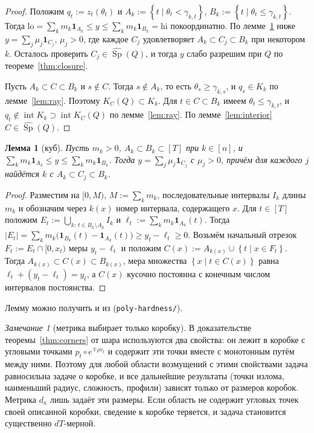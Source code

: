 \documentclass[a4paper,11pt]{article}
\newcommand{\lean}[1]{\mbox{\path{#1}}} %
\theoremstyle{plain}
\newtheorem{lemma}[theorem]{Лемма}
\theoremstyle{definition}
\theoremstyle{remark}
\newtheorem*{remark}{Замечание}
\newcommand{\abs}[1]{\left\lvert #1 \right\rvert}
\newcommand{\set}[1]{\left\{ #1 \right\}}
\DeclareMathOperator{\Sp}{Sp}
\DeclareMathOperator{\interior}{int}
\begin{document}
\begin{proof}
    Положим $q_t:=z_t(\theta_t)$ и $A_k:=\set{t\mid\theta_t<\gamma_{k,t}}$, $B_k:=\set{t\mid\theta_t\le\gamma_{k,t}}$. Тогда $\mathrm{lo}=\sum_km_k\mathbf 1_{A_k}\le y\le\sum_km_k\mathbf 1_{B_k}=\mathrm{hi}$ покоординатно. По лемме~\ref{lem:cube} ниже $y=\sum_j\mu_j\mathbf 1_{C_j}$, $\mu_j>0$, где каждое $C_j$ удовлетворяет $A_k\subset C_j\subset B_k$ при некотором $k$. Осталось проверить $C_j\in\widehat{\Sp}(Q)$, и тогда $y$ слабо разрешим при $Q$ по теореме~\ref{thm:closure}.

    Пусть $A_k\subset C\subset B_k$ и $s\notin C$. Тогда $s\notin A_k$, то есть $\theta_s\ge\gamma_{k,s}$, и $q_s\in K_k$ по лемме~\ref{lem:ray}. Поэтому $K_C(Q)\subset K_k$. Для $t\in C\subset B_k$ имеем $\theta_t\le\gamma_{k,t}$, и $q_t\notin\interior K_k\supset\interior K_C(Q)$ по лемме~\ref{lem:ray}. По лемме~\ref{lem:interior} $C\in\widehat{\Sp}(Q)$.
\end{proof}

\begin{lemma}[куб]\label{lem:cube}
    Пусть $m_k>0$, $A_k\subset B_k\subset[T]$ при $k\in[n]$, и $\sum_km_k\mathbf 1_{A_k}\le y\le\sum_km_k\mathbf 1_{B_k}$. Тогда $y=\sum_j\mu_j\mathbf 1_{C_j}$ с $\mu_j>0$, причём для каждого $j$ найдётся $k$ с $A_k\subset C_j\subset B_k$.
\end{lemma}

\begin{proof}
    Разместим на $[0,M)$, $M:=\sum_km_k$, последовательные интервалы $I_k$ длины $m_k$ и обозначим через $k(x)$ номер интервала, содержащего $x$. Для $t\in[T]$ положим $E_t:=\bigcup_{k:\,t\in B_k\setminus A_k}I_k$ и $\ell_t:=\sum_km_k\mathbf 1_{A_k}(t)$. Тогда $\abs{E_t}=\sum_km_k\bigl(\mathbf 1_{B_k}(t)-\mathbf 1_{A_k}(t)\bigr)\ge y_t-\ell_t\ge0$. Возьмём начальный отрезок $F_t:=E_t\cap[0,x_t)$ меры $y_t-\ell_t$ и положим $C(x):=A_{k(x)}\cup\set{t\mid x\in F_t}$. Тогда $A_{k(x)}\subset C(x)\subset B_{k(x)}$, мера множества $\set{x\mid t\in C(x)}$ равна $\ell_t+(y_t-\ell_t)=y_t$, а $C(x)$ кусочно постоянна с конечным числом интервалов постоянства.
\end{proof}

Лемму можно получить и из \lean{PolyHardness.cube_mem_span} (\texttt{poly-hardness/}).

\begin{remark}[метрика выбирает только коробку]
    В доказательстве теоремы~\ref{thm:corners} от шара используются два свойства: он лежит в коробке с угловыми точками $p_t\circ e^{\mp\rho v_t}$ и содержит эти точки вместе с монотонным путём между ними. Поэтому для любой области возмущений с этими свойствами задача равносильна задаче о коробке, и все дальнейшие результаты (точки излома, наименьший радиус, сложность, профили) зависят только от размеров коробок. Метрика $d_\kappa$ лишь задаёт эти размеры. Если область не содержит угловых точек своей описанной коробки, сведение к коробке теряется, и задача становится существенно $dT$-мерной.
\end{remark}
\end{document}

